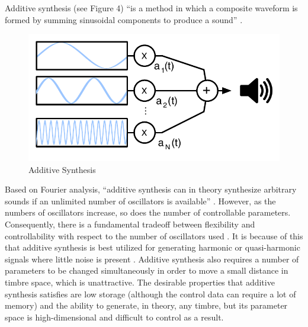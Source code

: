 \documentclass[12pt]{report} 	%
\numberwithin{figure}{chapter}
\numberwithin{table}{chapter}
\numberwithin{equation}{chapter}
\begin{document}
\begin{flushleft}
Additive synthesis (see Figure 4) ``is a method in which a composite waveform is formed by summing sinusoidal components to produce a sound'' \cite[p. 17]{Tolonen:1998bh}. 
\begin{figure}[h!]
\vspace{24pt}
\begin{center}
\includegraphics[scale=0.8]{AdditiveSynthesis}
\caption[Additive synthesis]{Additive Synthesis}
\end{center}
\vspace{6pt}
\end{figure}
Based on Fourier analysis, ``additive synthesis can in theory synthesize arbitrary sounds if an unlimited number of oscillators is available'' \cite[p. 94]{Tolonen:1998bh}. However, as the numbers of oscillators increase, so does the number of controllable parameters. Consequently, there is a fundamental tradeoff between flexibility and controllability with respect to the number of oscillators used \cite[p. 7]{Klingbeil:2009lo}. It is because of this that additive synthesis is best utilized for generating harmonic or quasi-harmonic signals where little noise is present \cite[p. 5]{Vercoe:1998hh}. Additive synthesis also requires a number of parameters to be changed simultaneously in order to move a small distance in timbre space, which is unattractive. The desirable properties that additive synthesis satisfies are low storage (although the control data can require a lot of memory) and the ability to generate, in theory, any timbre, but its parameter space is high-dimensional and difficult to control as a result.


\end{flushleft}
\end{document}
